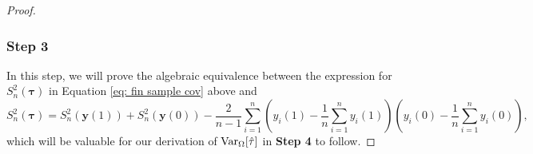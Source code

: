 \documentclass[12pt,leqno]{article}
\theoremstyle{newstyle}
\newcommand{\bZ}{\bm{Z}}   \newcommand{\bz}{\bm{z}}   %
\newcommand{\po}[2]{y_{#1}(#2)}     %
\newcommand{\pov}[1]{\bm{y}(#1)}    %
\newcommand{\tauhat}{\hat{\tau}}
\newcommand{\Ssq}[2][n]{S_{#1}^{2}(#2)}
\begin{document}
\begin{proof}
\subsubsection*{Step 3}

In this step, we will prove the algebraic equivalence between the expression for $\Ssq{\bm{\tau}}$ in Equation \eqref{eq: fin sample cov} above and
\small
\begin{equation}
\label{eq: fin sample cov II}
\Ssq{\bm{\tau}} = \Ssq{\pov{1}} + \Ssq{\pov{0}} - \dfrac{2}{n - 1} \sum \limits_{i = 1}^n \left(\po{i}{1} - \dfrac{1}{n} \sum \limits_{i = 1}^n \po{i}{1}\right)\left(\po{i}{0} - \dfrac{1}{n} \sum \limits_{i = 1}^n \po{i}{0}\right),
\end{equation}
\normalsize
which will be valuable for our derivation of $\VarZ[\tauhat]$ in \textbf{Step 4} to follow.


\end{proof}
\end{document}
